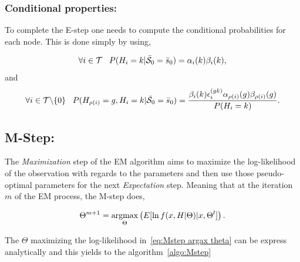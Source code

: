 \documentclass[a4paper,11pt]{report}
\begin{document}
			\subsubsection{Conditional properties:}
				\label{subsubsec:SHMT/Learning/E/Cond}
				
				To complete the E-step one needs to compute the conditional probabilities for each node. This is done simply by using,
				
				\begin{equation}
				  \forall i \in \mathcal{T} \;\;\; P(H_{i}=k | \bar{\mathcal{S}}_{0}=\bar{s}_{0}) = \alpha_{i}(k) \beta_{i}(k),
				  \label{eq:Estep cond proba node}
				\end{equation}
				and
				\begin{equation}
				  \forall i \in \mathcal{T}\backslash\{0\} 
				  \;\;\; P(H_{\rho(i)}=g, H_{i}=k | \bar{\mathcal{S}}_{0}=\bar{s}_{0}) = \frac{\beta_{i}(k)\epsilon_{i}^{(gk)}\alpha_{\rho(i)}(g)\beta_{\rho(i)}(g)}{P(H_{i}=k)}.
				  \label{eq:E-step cond proba and parent}
				\end{equation}
		
		\subsection{M-Step:}
			\label{subsec:SHMT/Learning/M}
			
			The \textit{Maximization} step of the EM algorithm aims to maximize the log-likelihood of the observation with regards to the parameters and then use those pseudo-optimal parameters for the next \textit{Expectation} step. Meaning that at the iteration $m$ of the EM process, the M-step does,
			
			\begin{equation}
				\Theta^{m+1} = \mathop{\rm argmax}_{\Theta} \left(E[\ln f(x,H|\Theta)|x,\Theta^{l}] \right).
				\label{eq:Mstep argax theta}
			\end{equation}
			
			The $\Theta$ maximizing the log-likelihood in~\ref{eq:Mstep argax theta} can be express analytically and this yields to the algorithm~\ref{algo:Mstep}
			
\end{document}
